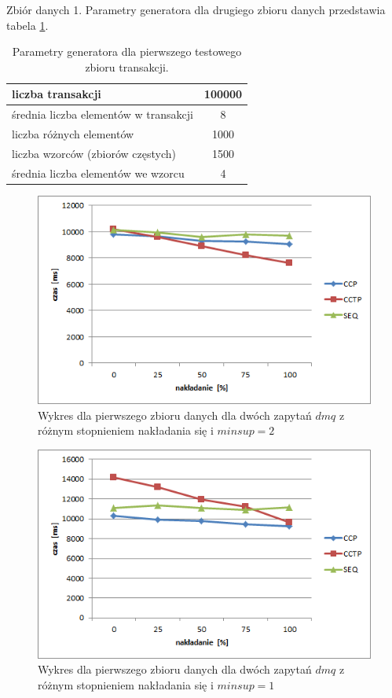 Zbiór danych 1.\newline
Parametry generatora dla drugiego zbioru danych przedstawia tabela \ref{table:firstDataSetParams}.
\begin{table}[h]
\begin{center}
	\begin{tabular}{| l | c |}
		\hline
		liczba transakcji & 100000 \\ \hline
		średnia liczba elementów w transakcji & 8 \\ \hline
		liczba różnych elementów & 1000 \\ \hline
		liczba wzorców (zbiorów częstych) & 1500 \\ \hline
		średnia liczba elementów we wzorcu & 4 \\ 
		\hline
	\end{tabular}
\end{center}
\caption{Parametry generatora dla pierwszego testowego zbioru transakcji.}
\label{table:firstDataSetParams}
\end{table}

\begin{figure}[h]
	\centering
	\includegraphics[width=0.8\linewidth]{figures/chart_100_2}
	\caption{Wykres dla pierwszego zbioru danych dla dwóch zapytań \(dmq\) z różnym stopnieniem nakładania się i \(minsup = 2\)}
	\label{fig:chart_100_2}
\end{figure}

\begin{figure}[h]
	\centering
	\includegraphics[width=0.8\linewidth]{figures/chart_100_1}
	\caption{Wykres dla pierwszego zbioru danych dla dwóch zapytań \(dmq\) z różnym stopnieniem nakładania się i \(minsup = 1\)}
	\label{fig:chart_100_1}
\end{figure}


